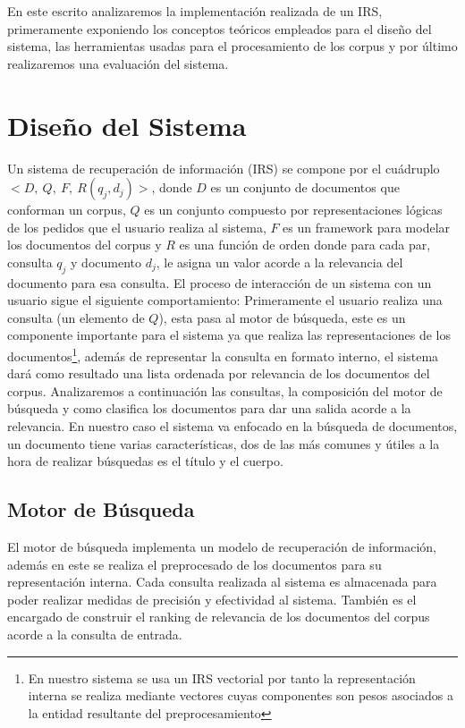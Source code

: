\documentclass[runningheads,a4paper]{llncs}
\begin{document}
En este escrito analizaremos la implementación realizada de un IRS, primeramente exponiendo los conceptos teóricos empleados para el diseño del sistema, las herramientas usadas para el procesamiento de los corpus y por último realizaremos una evaluación del sistema. 

\section{Diseño del Sistema}

Un sistema de recuperación de información (IRS) se compone por el cuádruplo $<D,\ Q,\ F,\ R(q_j, d_j)>$, donde $D$ es un conjunto de documentos que conforman un corpus, $Q$ es un conjunto compuesto por representaciones lógicas de los pedidos que el usuario realiza al sistema, $F$ es un framework para modelar los documentos del corpus y $R$ es una función de orden donde para cada par, consulta $q_j$ y documento $d_j$, le asigna un valor acorde a la relevancia del documento para esa consulta. El proceso de interacción de un sistema con un usuario sigue el siguiente comportamiento: Primeramente el usuario realiza una consulta (un elemento de $Q$), esta pasa al motor de búsqueda, este es un componente importante para el sistema ya que realiza las representaciones de los documentos\footnote{En nuestro sistema se usa un IRS vectorial por tanto la representación interna se realiza mediante vectores cuyas componentes son pesos asociados a la entidad resultante del preprocesamiento}, además de representar la consulta en formato interno, el sistema dará como resultado una lista ordenada por relevancia de los documentos del corpus. Analizaremos a continuación las consultas, la composición del motor de búsqueda y como clasifica los documentos para dar una salida acorde a la relevancia. En nuestro caso el sistema va enfocado en la búsqueda de documentos, un documento tiene varias características, dos de las más comunes y útiles a la hora de realizar búsquedas es el título y el cuerpo.

\subsection*{Motor de Búsqueda}

El motor de búsqueda implementa un modelo de recuperación de información, además en este se realiza el preprocesado de los documentos para su representación interna. Cada consulta realizada al sistema es almacenada para poder realizar medidas de precisión y efectividad al sistema. También es el encargado de construir el ranking de relevancia de los documentos del corpus acorde a la consulta de entrada.
\end{document}

